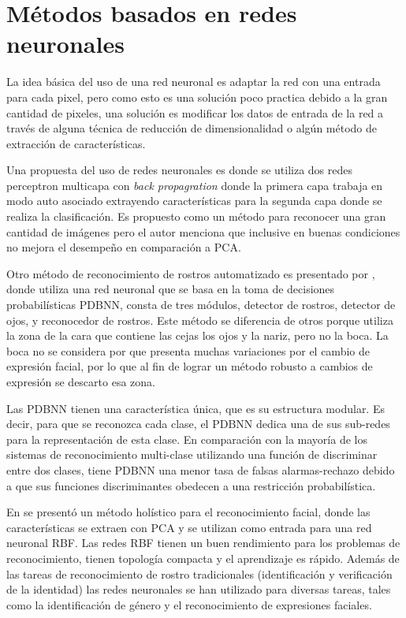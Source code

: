 
\section{Métodos basados en redes neuronales}

La idea básica del uso de una red neuronal es adaptar la red con una entrada para cada pixel, pero como esto es una solución poco practica debido a la gran cantidad de pixeles, una solución es modificar los datos de entrada de la red a través de alguna técnica de reducción de dimensionalidad o algún método de extracción de características.

Una propuesta del uso de redes neuronales es \cite{cottrell1990face}  donde se utiliza dos redes perceptron multicapa con \textit{back propagration} donde la primera capa trabaja en modo auto asociado extrayendo características para la segunda capa donde se realiza la clasificación. Es propuesto como un método para reconocer una gran cantidad de imágenes pero el autor menciona que inclusive en buenas condiciones no mejora el desempeño en comparación a \ac{PCA}.

Otro método de reconocimiento de rostros automatizado es presentado por \cite{lin1997face}, donde utiliza una red neuronal que se basa en la toma de decisiones probabilísticas \ac{PDBNN}, consta de tres módulos, detector de rostros, detector de ojos, y reconocedor de rostros. Este método se diferencia de otros porque utiliza la zona de la cara que contiene las cejas los ojos y la nariz, pero no la boca. La boca no se considera por que presenta muchas variaciones por el cambio de expresión facial, por lo que al fin de lograr un método robusto a cambios de expresión se descarto esa zona.

Las \acf{PDBNN} tienen una característica única, que es su estructura modular. Es decir, para que se reconozca cada clase, el \ac{PDBNN} dedica una de sus sub-redes para la representación de esta clase. En comparación con la mayoría de los sistemas de reconocimiento multi-clase utilizando una función de discriminar entre dos clases, tiene \ac{PDBNN} una menor tasa de falsas alarmas-rechazo debido a que sus funciones discriminantes obedecen a una restricción probabilística.

En \cite{er2002face} se  presentó un método holístico para el reconocimiento facial, donde las características se extraen con \ac{PCA} y se utilizan como entrada para una red neuronal \ac{RBF}. Las redes \ac{RBF} tienen un buen rendimiento para los problemas de reconocimiento, tienen topología compacta y el aprendizaje es rápido. Además de las tareas de reconocimiento de rostro tradicionales  (identificación y verificación de la identidad) las redes neuronales se han utilizado para diversas tareas, tales como la identificación de género y el reconocimiento de expresiones faciales. 

